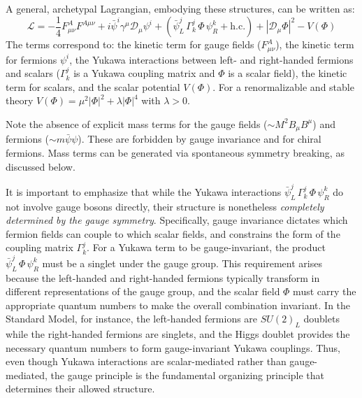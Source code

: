 A general, archetypal Lagrangian, embodying these structures, can be written as:
\begin{equation}\label{eq:generic-renorm-lag}
	\mathcal{L} = -\frac{1}{4} F_{\mu \nu}^A F^{A \mu \nu} + i \bar{\psi}^i \gamma^\mu \mathcal{D}_\mu \psi^i + \left(\bar{\psi}_L^j \, \Gamma^j_k \, \Phi \, \psi_R^k + \text{h.c.}\right) + |\mathcal{D}_\mu \Phi|^2 - V(\Phi)
\end{equation}
The terms correspond to: the kinetic term for gauge fields ($F_{\mu \nu}^A$), the kinetic term for fermions $\psi^i$, the Yukawa interactions between left- and right-handed fermions and scalars ($\Gamma^j_k$ is a Yukawa coupling matrix and $\Phi$ is a scalar field), the kinetic term for scalars, and the scalar potential $V(\Phi)$. For a renormalizable and  stable theory $V(\Phi) = \mu^2 |\Phi|^2 + \lambda |\Phi|^4$ with $\lambda > 0$.

Note the absence of explicit mass terms for the gauge fields ($\sim M^2 B_\mu B^\mu$) and fermions ($\sim m \bar{\psi}\psi$). These are forbidden by gauge invariance and for chiral fermions. Mass terms can be generated via spontaneous symmetry breaking, as discussed below.

It is important to emphasize that while the Yukawa interactions $\bar{\psi}_L^j \, \Gamma^j_k \, \Phi \, \psi_R^k$ do not involve gauge bosons directly, their structure is nonetheless \textit{completely determined by the gauge symmetry}. Specifically, gauge invariance dictates which fermion fields can couple to which scalar fields, and constrains the form of the coupling matrix $\Gamma^j_k$. For a Yukawa term to be gauge-invariant, the product $\bar{\psi}_L^j \, \Phi \, \psi_R^k$ must be a singlet under the gauge group. This requirement arises because the left-handed and right-handed fermions typically transform in different representations of the gauge group, and the scalar field $\Phi$ must carry the appropriate quantum numbers to make the overall combination invariant. In the Standard Model, for instance, the left-handed fermions are $SU(2)_L$ doublets while the right-handed fermions are singlets, and the Higgs doublet provides the necessary quantum numbers to form gauge-invariant Yukawa couplings. Thus, even though Yukawa interactions are scalar-mediated rather than gauge-mediated, the gauge principle is the fundamental organizing principle that determines their allowed structure.

